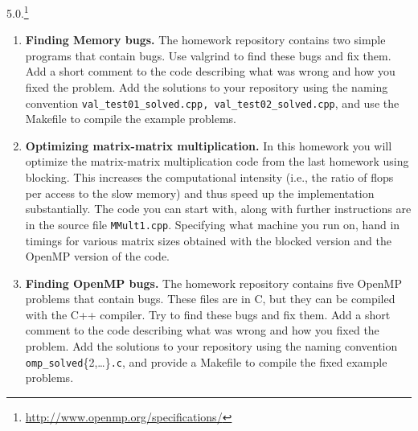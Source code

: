 \documentclass[12pt]{article}
\begin{document}
5.0.\footnote{\url{http://www.openmp.org/specifications/}}
\\[1ex]
%
\begin{enumerate}
 \item {\bf Finding Memory bugs.}  The homework repository contains
   two simple programs that contain bugs. Use valgrind to find these
   bugs and fix them. Add a short comment to the code describing what
   was wrong and how you fixed the problem. Add the solutions to your
   repository using the naming convention
   \texttt{val\_test01\_solved.cpp, val\_test02\_solved.cpp}, and use
   the Makefile to compile the example problems.

  \item {\bf Optimizing matrix-matrix multiplication.} In this
    homework you will optimize the matrix-matrix multiplication code
    from the last homework using blocking. This increases the
    computational intensity (i.e., the ratio of flops per access to
    the slow memory) and thus speed up the implementation
    substantially. The code you can start with, along with further
    instructions are in the source file
    \texttt{MMult1.cpp}. Specifying what machine you run on, hand in
    timings for various matrix sizes obtained with the blocked version
    and the OpenMP version of the code.

\item {\bf Finding OpenMP bugs.}  The homework repository contains five
  OpenMP problems that contain bugs. These files are in C, but they
  can be compiled with the C++ compiler. Try to find these bugs and fix
  them. Add a short comment to the code describing what was wrong and
  how you fixed the problem. Add the solutions to your repository
  using the naming convention
  \texttt{omp\_solved}\{2,\ldots\}\texttt{.c}, and provide a Makefile
  to compile the fixed example problems.


\end{enumerate}
\end{document}
